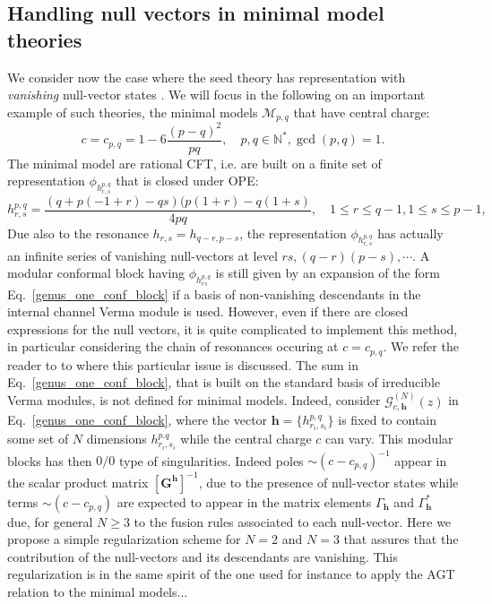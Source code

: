 \documentclass[a4paper,11pt]{article}
\begin{document}
\subsection{Handling null vectors in minimal model theories }
\label{null_vec1}
We consider now the case where the seed theory has representation with {\it vanishing} null-vector states \cite{BPZ}. 
We will focus in the following on an  important example of such theories, the minimal models $\mathcal{M}_{p,q}$ that have central  charge:
\begin{equation}
c=c_{p,q}= 1 -6\frac{ (p-q)^2}{p q}, \quad p,q \in \mathbb{N}^*, \gcd(p,q)=1.
\end{equation}
 The minimal model are rational CFT, i.e. are built on a  finite set of representation $\phi_{h^{p,q}_{r,s}}$ that is closed under OPE:
 \begin{equation}
 h^{p,q}_{r,s}=\frac{(q + p (-1 + r) - q s) (p (1 + r) - q (1 + s)}{4 p q}, \quad 1\leq r\leq q-1,  1\leq s\leq p-1,
 \end{equation}
Due also to the resonance $h_{r,s}=h_{q-r,p-s}$, the representation $\phi_{h^{p,q}_{r,s}}$ has actually an infinite series of vanishing null-vectors at level $r s, (q-r)(p-s), \cdots$.  A modular conformal block having $\phi_{h^{p,q}_{rs}}$ is still given by an expansion of the form Eq.~\eqref{genus_one_conf_block} if a basis of non-vanishing descendants in the internal channel Verma module is used. However, even if there are closed expressions for the null vectors, it is quite complicated to implement this method, in particular considering the chain of resonances occuring at $c=c_{p,q}$. We refer the reader to \cite{Javerzat} to where this particular issue is discussed. The sum in Eq.~\eqref{genus_one_conf_block}, that is built on the standard basis of irreducible Verma modules,  is not defined for minimal models. Indeed, consider  $\mathcal{G}_{c, \boldsymbol{h}}^{(N)}(z)$ in  Eq.~\eqref{genus_one_conf_block},  where the vector $\boldsymbol{h}=\{h^{p,q}_{r_i,s_i}\}$ is fixed to contain some set of $N$ dimensions $h^{p.q}_{r_i,s_i}$ while the central charge $c$ can vary.  This modular blocks  has then $0/0$ type of singularities. Indeed poles $\sim (c-c_{p,q})^{-1}$ appear in the scalar product matrix  $\left[\boldsymbol{G}^{\boldsymbol{h}}\right]^{-1}$, due to the presence of null-vector states while terms $\sim(c-c_{p,q})$ are expected to appear in the matrix elements $\Gamma_{\boldsymbol{h}}$ and $\Gamma^{*}_{\boldsymbol{h}}$ due, for general $N\geq 3$ to the fusion rules associated to each null-vector. Here we propose a simple regularization scheme for $N=2$ and $N=3$ that assures that the contribution of the null-vectors and its descendants are  vanishing. This regularization is in the same spirit of the one used for instance to apply the AGT relation to the minimal models...
\end{document}
